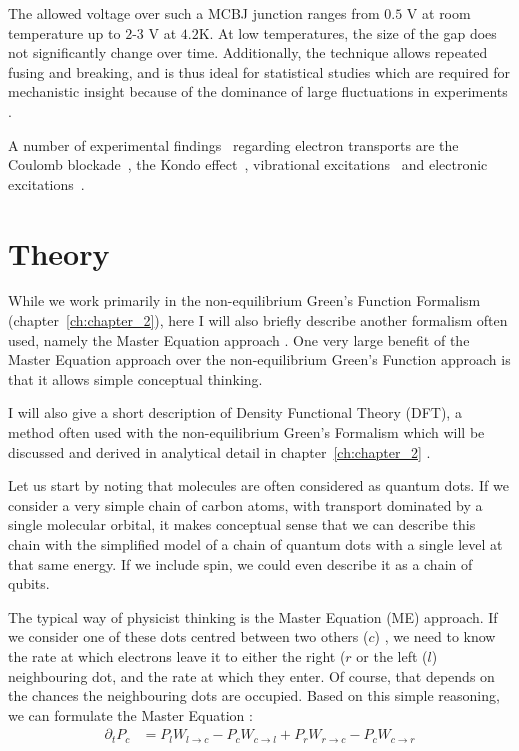 The allowed voltage over such a MCBJ junction ranges from $0.5$ V at room temperature up to $2$-$3$ V at $4.2$K. At low temperatures, the size of the gap does not significantly change over time. Additionally, the technique allows repeated fusing and breaking, and is thus ideal for statistical studies which are required for mechanistic insight because of the dominance of large fluctuations in experiments \cite{ratnerrev2013}.

A number of experimental findings~\cite{koole} regarding electron transports are the Coulomb blockade~\cite{Park2000, Park2002}, the Kondo effect~\cite{Park2002}, vibrational excitations~\cite{vib1, vib2} and electronic excitations~\cite{elec1}.

\section{Theory}
While we work primarily in the non-equilibrium Green's Function Formalism (chapter~\ref{ch:chapter_2}), here I will also briefly describe another formalism often used, namely the Master Equation approach \cite{seldenthuis}. One very large benefit of the Master Equation approach over the non-equilibrium Green's Function approach is that it allows simple conceptual thinking.

I will also give a short description of Density Functional Theory (DFT), a method often used with the non-equilibrium Green's Formalism which will be discussed and derived in analytical detail in chapter~\ref{ch:chapter_2}  .

Let us start by noting that molecules are often considered as quantum dots. If we consider a very simple chain of carbon atoms, with transport dominated by a single molecular orbital, it makes conceptual sense that we can describe this chain with the simplified model of a chain of quantum dots with a single level at that same energy. If we include spin, we could even describe it as a chain of qubits.

The typical way of physicist thinking is the Master Equation (ME) approach. If we consider one of these dots centred between two others ($c$) , we need to know the rate at which electrons leave it to either the right ($r$ or the left ($l$) neighbouring dot, and the rate at which they enter. Of course, that depends on the chances the neighbouring dots are occupied. Based on this simple reasoning, we can formulate the Master Equation \cite{beenakker}:
\begin{align*}
\partial_t P_c &= P_l W_{l\rightarrow c} - P_c W_{c\rightarrow l} + P_r  W_{r\rightarrow c} - P_c W_{c\rightarrow r}
\end{align*}

